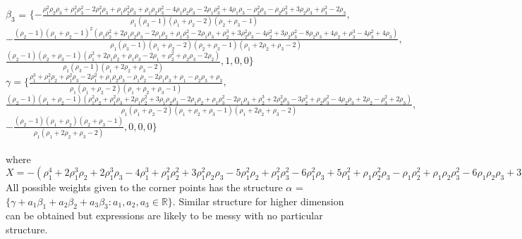 \documentclass[12pt, a4paper]{report}
\begin{document}
\\
$\beta_3$ = $\{-\frac{\rho_1^2 \rho_2 \rho_3+\rho_1^2 \rho_3^2-2 \rho_1^2 \rho_3+\rho_1 \rho_2^2 \rho_3+\rho_1 \rho_2 \rho_3^2-4 \rho_1 \rho_2 \rho_3-2 \rho_1 \rho_3^2+4 \rho_1 \rho_3-\rho_2^2 \rho_3-\rho_2 \rho_3^2+3 \rho_2 \rho_3+\rho_3^2-2 \rho_3}{\rho_1 (\rho_3-1) (\rho_1+\rho_2-2) (\rho_2+\rho_3-1)},$\\$-\frac{(\rho_2-1) (\rho_1+\rho_2-1)^2 \left(\rho_1 \rho_2^2+2 \rho_1 \rho_2 \rho_3-2 \rho_1 \rho_2+\rho_1 \rho_3^2-2 \rho_1 \rho_3+\rho_2^3+3 \rho_2^2 \rho_3-4 \rho_2^2+3 \rho_2 \rho_3^2-8 \rho_2 \rho_3+4 \rho_2+\rho_3^3-4 \rho_3^2+4 \rho_3\right)}{\rho_1 (\rho_3-1) (\rho_1+\rho_2-2) (\rho_2+\rho_3-1) (\rho_1+2 \rho_2+\rho_3-2)},$\\$\frac{(\rho_2-1) (\rho_2+\rho_3-1) \left(\rho_1^2+2 \rho_1 \rho_2+\rho_1 \rho_3-2 \rho_1+\rho_2^2+\rho_2 \rho_3-2 \rho_2\right)}{\rho_1 (\rho_3-1) (\rho_1+2 \rho_2+\rho_3-2)},1,0,0\}$\\
 $\gamma = \{ \frac{\rho_1^3+\rho_1^2 \rho_2+\rho_1^2 \rho_3-2 \rho_1^2+\rho_1 \rho_2 \rho_3-\rho_1 \rho_2-2 \rho_1 \rho_3+\rho_1-\rho_2 \rho_3+\rho_3}{\rho_1 (\rho_1+\rho_2-2) (\rho_1+\rho_2+\rho_3-1)},$\\$\frac{(\rho_2-1) (\rho_1+\rho_2-1) \left(\rho_1^2 \rho_2+\rho_1^2 \rho_3+2 \rho_1 \rho_2^2+3 \rho_1 \rho_2 \rho_3-2 \rho_1 \rho_2+\rho_1 \rho_3^2-2 \rho_1 \rho_3+\rho_2^3+2 \rho_2^2 \rho_3-3 \rho_2^2+\rho_2 \rho_3^2-4 \rho_2 \rho_3+2 \rho_2-\rho_3^2+2 \rho_3\right)}{\rho_1 (\rho_1+\rho_2-2) (\rho_1+\rho_2+\rho_3-1) (\rho_1+2 \rho_2+\rho_3-2)},$\\$-\frac{(\rho_2-1) (\rho_1+\rho_2) (\rho_2+\rho_3-1)}{\rho_1 (\rho_1+2 \rho_2+\rho_3-2)},0,0,0\}$\\ \\
where $X = -(\rho_1^4+2 \rho_1^3 \rho_2+2 \rho_1^3 \rho_3-4 \rho_1^3+\rho_1^2 \rho_2^2+3 \rho_1^2 \rho_2 \rho_3-5 \rho_1^2 \rho_2+\rho_1^2 \rho_3^2-6 \rho_1^2 \rho_3+5 \rho_1^2+\rho_1 \rho_2^2 \rho_3-\rho_1 \rho_2^2+\rho_1 \rho_2 \rho_3^2-6 \rho_1 \rho_2 \rho_3+3 \rho_1 \rho_2-2  \rho_1 \rho_3^2+6 \rho_1 \rho_3-2 \rho_1-\rho_2^2 \rho_3-\rho_2 \rho_3^2+3 \rho_2 \rho_3+\rho_3^2-2 \rho_3).$ All possible weights given to the corner points has the structure $\alpha$ = $\{\gamma + a_1\beta_1+ a_2\beta_2+ a_3\beta_3: a_1,a_2,a_3 \in \mathbb{R}\}$. Similar structure for higher dimension can be obtained but expressions are likely to be messy with no particular structure.
\end{document}
